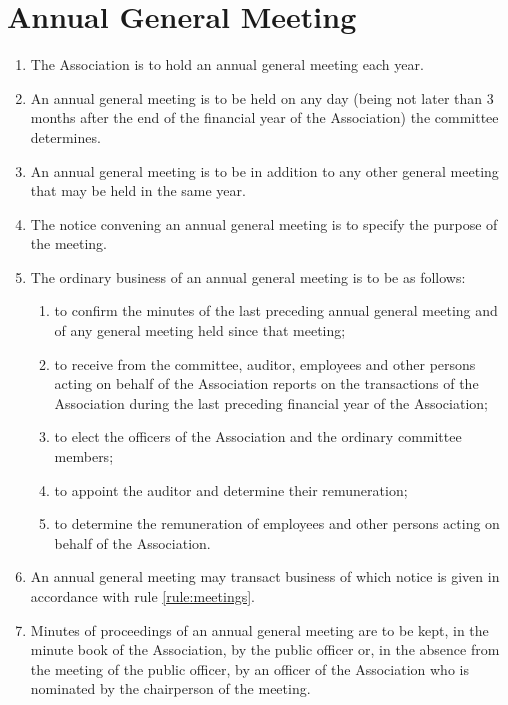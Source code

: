 \section{Annual General Meeting}
\label{rule:agm}

\begin{enumerate}
	\item The Association is to hold an annual general meeting each year.
	\item An annual general meeting is to be held on any day (being not later than 3 months after the end of the financial year of the Association) the committee determines.
	\item An annual general meeting is to be in addition to any other general meeting that may be held in the same year.
	\item The notice convening an annual general meeting is to specify the purpose of the meeting.
	
	\item \label{subrule:agm:ordinaryBusiness} The ordinary business of an annual general meeting is to be as follows:
	\begin{enumerate}
		\item to confirm the minutes of the last preceding annual general meeting and of any general meeting held since that meeting;
		\item \label{subsubrule:agm:ordinaryBusiness:reports} to receive from the committee, auditor, employees and other persons acting on behalf of the Association reports on the transactions of the Association during the last preceding financial year of the Association;
		\item to elect the officers of the Association and the ordinary committee members;
		\item \label{subsubrule:agm:ordinaryBusiness:auditor} to appoint the auditor and determine their remuneration;
		\item to determine the remuneration of employees and other persons acting on behalf of the Association.
	\end{enumerate}
	
	\item An annual general meeting may transact business of which notice is given in accordance with rule \ref{rule:meetings}.
	\item Minutes of proceedings of an annual general meeting are to be kept, in the minute book of the Association, by the public officer or, in the absence from the meeting of the public officer, by an officer of the Association who is nominated by the chairperson of the meeting.
\end{enumerate}